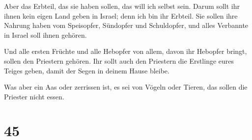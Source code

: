  Aber das Erbteil, das sie haben sollen, das will ich
selbst sein. Darum sollt ihr ihnen kein eigen Land geben in Israel; denn
ich bin ihr Erbteil.  Sie sollen ihre Nahrung haben vom
Speisopfer, Sündopfer und Schuldopfer, und alles Verbannte in Israel
soll ihnen gehören.

 Und alle ersten Früchte und alle Hebopfer von allem,
davon ihr Hebopfer bringt, sollen den Priestern gehören. Ihr sollt auch
den Priestern die Erstlinge eures Teiges geben, damit der Segen in
deinem Hause bleibe.

 Was aber ein Aas oder zerrissen ist, es sei von Vögeln
oder Tieren, das sollen die Priester nicht essen.

\hypertarget{section-44}{%
\section{45}\label{section-44}}


